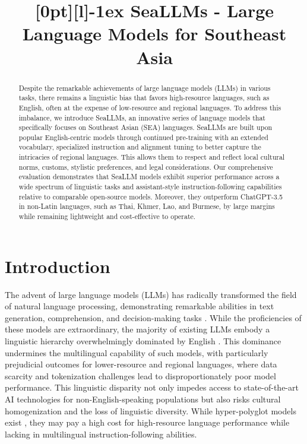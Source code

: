 \title{[0pt][l]{-1ex} SeaLLMs - Large Language Models for Southeast Asia}

\begin{abstract}
Despite the remarkable achievements of large language models (LLMs) in various tasks, there remains a linguistic bias that favors high-resource languages, such as English, often at the expense of low-resource and regional languages. To address this imbalance, we introduce SeaLLMs, an innovative series of language models that specifically focuses on Southeast Asian (SEA) languages. SeaLLMs are built upon popular English-centric models through continued pre-training with an extended vocabulary, specialized instruction and alignment tuning to better capture the intricacies of regional languages. This allows them to respect and reflect local cultural norms, customs, stylistic preferences, and legal considerations. Our comprehensive evaluation demonstrates that SeaLLM models exhibit superior performance across a wide spectrum of linguistic tasks and assistant-style instruction-following capabilities relative to comparable open-source models. Moreover, they outperform ChatGPT-3.5 in non-Latin languages, such as Thai, Khmer, Lao, and Burmese, by large margins while remaining lightweight and cost-effective to operate.
\end{abstract}

\section{Introduction}\label{sec:intro}

The advent of large language models (LLMs) has radically transformed the field of natural language processing, demonstrating remarkable abilities in text generation, comprehension, and decision-making tasks \cite{gpt3_brown2020language,chatgpt,gpt4,llama_touvron2023,llama2touvron2023llama,lambda_google_thoppilan2022lamda,mistral7b_jiang2023mistral,polylm_wei2023polylm,qwen_bai2023}. While the proficiencies of these models are extraordinary, the majority of existing LLMs embody a linguistic hierarchy overwhelmingly dominated by English \cite{mega, multilingual-eval, m3exam}. This dominance undermines the multilingual capability of such models, with particularly prejudicial outcomes for lower-resource and regional languages, where data scarcity and tokenization challenges lead to disproportionately poor model performance. This linguistic disparity not only impedes access to state-of-the-art AI technologies for non-English-speaking populations but also risks cultural homogenization and the loss of linguistic diversity. While hyper-polyglot models exist \citep{bloom_scao2022bloom,bloomz_muennighoff2022crosslingual,polylm_wei2023polylm}, they may pay a high cost for high-resource language performance while lacking in multilingual instruction-following abilities.

